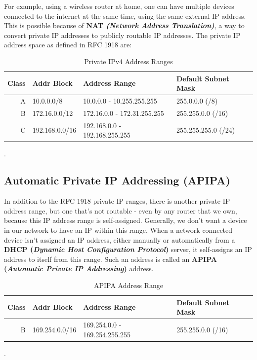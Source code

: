 For example, using a wireless router at home, one can have multiple devices connected to the internet at the same time, using the same external IP address. This is possible because of \textbf{NAT \textit{(Network Address Translation)}}, a way to convert private IP addresses to publicly routable IP addresses. The private IP address space as defined in RFC 1918 are:

\begin{table}[H]
	\centering
	\begin{tabular}{rlll}
		\toprule
		\textbf{Class} &\textbf{Addr Block} &\textbf{Address Range} &\textbf{Default Subnet Mask} \\
		\midrule
		A &10.0.0.0/8 &10.0.0.0 - 10.255.255.255 &255.0.0.0 (/8) \\
		B &172.16.0.0/12 &172.16.0.0 - 172.31.255.255 &255.255.0.0 (/16) \\
		C &192.168.0.0/16 &192.168.0.0 - 192.168.255.255 &255.255.255.0 (/24) \\
		\bottomrule
	\end{tabular}
	\vspace{-5pt}
	\caption{Private IPv4 Address Ranges}.
\end{table}
\vspace{-20pt}

\subsection{Automatic Private IP Addressing (APIPA)}
In addition to the RFC 1918 private IP ranges, there is another private IP address range, but one that's not routable - even by any router that we own, because this IP address range is self-assigned. Generally, we don't want a device in our network to have an IP within this range. When a network connected device isn't assigned an IP address, either manually or automatically from a \textbf{DHCP (\textit{Dynamic Host Configuration Protocol})} server, it self-assigns an IP address to itself from this range. Such an address is called an \textbf{APIPA (\textit{Automatic Private IP Addressing})} address. 
\begin{table}[H]
	\centering
	\begin{tabular}{rlll}
		\toprule
		\textbf{Class} &\textbf{Addr Block} &\textbf{Address Range} &\textbf{Default Subnet Mask} \\
		\midrule
		B &169.254.0.0/16 &169.254.0.0 - 169.254.255.255 &255.255.0.0 (/16) \\
		\bottomrule
	\end{tabular}
	\vspace{-5pt}
	\caption{APIPA Address Range}.
\end{table}
\vspace{-20pt}

